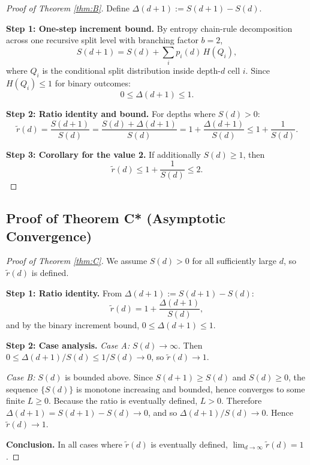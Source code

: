 \documentclass[11pt,a4paper]{article}
\theoremstyle{definition}
\theoremstyle{remark}
\newcommand{\rtilde}{\tilde{r}}
\begin{document}
\begin{proof}[Proof of Theorem \ref{thm:B}]
Define $\Delta(d+1):=S(d+1)-S(d)$.

\textbf{Step 1: One-step increment bound.}
By entropy chain-rule decomposition across one recursive split level with
branching factor $b=2$,
\begin{equation}
    S(d+1)=S(d)+\sum_i p_i(d)\,H(Q_i),
\end{equation}
where $Q_i$ is the conditional split distribution inside depth-$d$ cell $i$.
Since $H(Q_i)\le1$ for binary outcomes:
\begin{equation}
    0 \le \Delta(d+1)\le1.
\end{equation}

\textbf{Step 2: Ratio identity and bound.}
For depths where $S(d)>0$:
\begin{equation}
    \rtilde(d)=\frac{S(d+1)}{S(d)}=\frac{S(d)+\Delta(d+1)}{S(d)}
    =1+\frac{\Delta(d+1)}{S(d)}\le 1+\frac{1}{S(d)}.
\end{equation}

\textbf{Step 3: Corollary for the value 2.}
If additionally $S(d)\ge1$, then
\begin{equation}
    \rtilde(d)\le1+\frac{1}{S(d)}\le2.
\end{equation}
\end{proof}

\subsection{Proof of Theorem C* (Asymptotic Convergence)}

\begin{proof}[Proof of Theorem \ref{thm:C}]
We assume $S(d)>0$ for all sufficiently large $d$, so $\rtilde(d)$ is defined.

\textbf{Step 1: Ratio identity.}
From $\Delta(d+1):=S(d+1)-S(d)$:
\begin{equation}
    \rtilde(d)=1+\frac{\Delta(d+1)}{S(d)},
\end{equation}
and by the binary increment bound, $0\le\Delta(d+1)\le1$.

\textbf{Step 2: Case analysis.}
\emph{Case A:} $S(d)\to\infty$. Then $0\le \Delta(d+1)/S(d)\le 1/S(d)\to0$, so
$\rtilde(d)\to1$.

\emph{Case B:} $S(d)$ is bounded above. Since $S(d+1)\ge S(d)$ and $S(d)\ge0$, the
sequence $\{S(d)\}$ is monotone increasing and bounded, hence converges to some finite
$L\ge0$. Because the ratio is eventually defined, $L>0$. Therefore
$\Delta(d+1)=S(d+1)-S(d)\to0$, and so $\Delta(d+1)/S(d)\to0$.
Hence $\rtilde(d)\to1$.

\textbf{Conclusion.}
In all cases where $\rtilde(d)$ is eventually defined, $\lim_{d\to\infty}\rtilde(d)=1$.
\end{proof}
\end{document}
